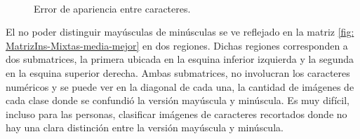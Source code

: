 		\begin{figure}[htbp]
			\centering
			\\
			\caption[Error de apariencia]{Error de apariencia entre caracteres.}
			\label{fig: Error-Apariencia}
		\end{figure}


	El no poder distinguir mayúsculas de minúsculas se ve reflejado en la matriz \ref{fig: MatrizIns-Mixtas-media-mejor} en dos regiones. Dichas regiones corresponden a dos submatrices, la primera ubicada en la esquina inferior izquierda y la segunda en la esquina superior derecha. Ambas submatrices, no involucran los caracteres numéricos y se puede ver en la diagonal de cada una, la cantidad de imágenes de cada clase donde se confundió la versión mayúscula y minúscula. Es muy difícil, incluso para las personas, clasificar imágenes de caracteres recortados donde no hay una clara distinción entre la versión mayúscula y minúscula.

